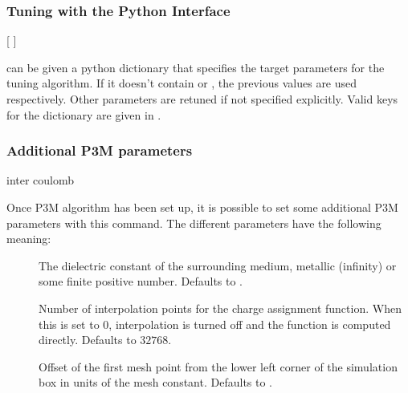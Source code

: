 \subsubsection{Tuning with the Python Interface}
\label{ssec:tunep3mPY}

\begin{pysyntax}
	[
    ]

	\begin{features}
	\end{features}
\end{pysyntax}

 can be given a python dictionary that specifies the target parameters for 
the tuning algorithm. If it doesn't contain  or
, the previous values are used respectively. Other parameters are 
retuned if not specified explicitly. Valid keys for the dictionary are given 
in .

\subsubsection{Additional P3M parameters}

\begin{essyntax}
  inter coulomb 
   
\end{essyntax}

Once P3M algorithm has been set up, it is possible to set some
additional P3M parameters with this command.  The different parameters
have the following meaning:
\begin{description}
\item[ ] The dielectric constant of the
  surrounding medium, metallic (\ie infinity) or some finite positive
  number.  Defaults to .
\item[ ] Number of interpolation
  points for the charge assignment function.  When this is set to $0$,
  interpolation is turned off and the function is computed directly.
  Defaults to $32768$.
\item[ ] Offset of the first mesh point
  from the lower left corner of the simulation box in units of the
  mesh constant. Defaults to .
\end{description}


